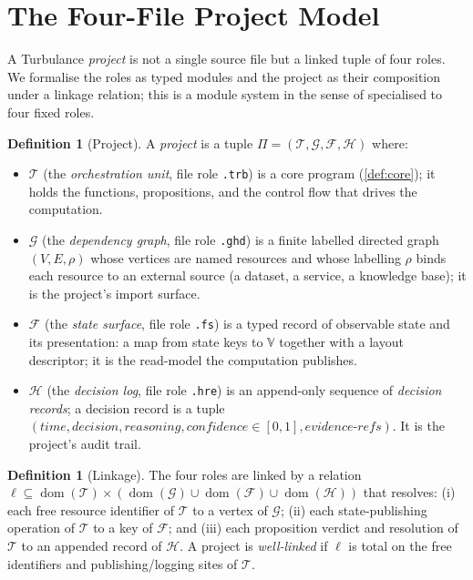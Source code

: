 \documentclass[11pt,a4paper]{article}
\theoremstyle{plain}
\theoremstyle{definition}
\newtheorem{definition}[theorem]{Definition}
\theoremstyle{remark}
\DeclareMathOperator{\dom}{dom}                           %
\newcommand{\Val}{\mathbb{V}}
\newcommand{\Unit}{[0,1]}
\begin{document}
\section{The Four-File Project Model}
\label{sec:fourfile}

A Turbulance \emph{project} is not a single source file but a linked tuple of
four roles. We formalise the roles as typed modules and the project as their
composition under a linkage relation; this is a module system in the sense of
\citet{cardelli1985} specialised to four fixed roles.

\begin{definition}[Project]
\label{def:project}
A \emph{project} is a tuple
$\Pi=(\mathcal{T},\mathcal{G},\mathcal{F},\mathcal{H})$ where:
\begin{itemize}[leftmargin=1.4em,nosep]
\item $\mathcal{T}$ (the \emph{orchestration unit}, file role \texttt{.trb}) is
a core program (\cref{def:core}); it holds the functions, propositions, and the
control flow that drives the computation.
\item $\mathcal{G}$ (the \emph{dependency graph}, file role \texttt{.ghd}) is a
finite labelled directed graph $(V,E,\rho)$ whose vertices are named resources
and whose labelling $\rho$ binds each resource to an external source
(a dataset, a service, a knowledge base); it is the project's import surface.
\item $\mathcal{F}$ (the \emph{state surface}, file role \texttt{.fs}) is a
typed record of observable state and its presentation: a map from state keys to
$\Val$ together with a layout descriptor; it is the read-model the computation
publishes.
\item $\mathcal{H}$ (the \emph{decision log}, file role \texttt{.hre}) is an
append-only sequence of \emph{decision records}; a decision record is a tuple
$(\textit{time},\textit{decision},\textit{reasoning},\textit{confidence}\in\Unit,
\textit{evidence-refs})$. It is the project's audit trail.
\end{itemize}
\end{definition}

\begin{definition}[Linkage]
\label{def:linkage}
The four roles are linked by a relation $\ell\subseteq
\dom(\mathcal{T})\times(\dom(\mathcal{G})\cup\dom(\mathcal{F})\cup
\dom(\mathcal{H}))$ that resolves: (i) each free resource identifier of
$\mathcal{T}$ to a vertex of $\mathcal{G}$; (ii) each state-publishing operation
of $\mathcal{T}$ to a key of $\mathcal{F}$; and (iii) each proposition verdict
and resolution of $\mathcal{T}$ to an appended record of $\mathcal{H}$. A
project is \emph{well-linked} if $\ell$ is total on the free identifiers and
publishing/logging sites of $\mathcal{T}$.
\end{definition}
\end{document}
